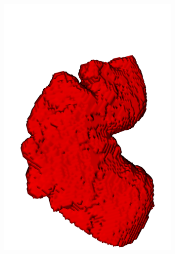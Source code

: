 \documentclass[review]{elsarticle}
\begin{document}
\begin{figure}[t]
  \centering
  \begin{subfigure}[b]{.25\linewidth}
    \centering
    \includegraphics[width=\textwidth]{fig10a.png}
    \caption{}%
    \label{fig:refinement_notadded} 
  \end{subfigure}%
  \hspace{1em}
  \begin{subfigure}[b]{.25\linewidth}
    \centering

\end{subfigure}
\end{figure}
\end{document}
